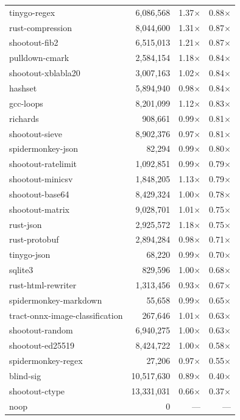\begin{longtable}{l r r r}
tinygo-regex & 6{,}086{,}568 & 1.37$\times$ & 0.88$\times$ \\
rust-compression & 8{,}044{,}600 & 1.31$\times$ & 0.87$\times$ \\
shootout-fib2 & 6{,}515{,}013 & 1.21$\times$ & 0.87$\times$ \\
pulldown-cmark & 2{,}584{,}154 & 1.18$\times$ & 0.84$\times$ \\
shootout-xblabla20 & 3{,}007{,}163 & 1.02$\times$ & 0.84$\times$ \\
hashset & 5{,}894{,}940 & 0.98$\times$ & 0.84$\times$ \\
gcc-loops & 8{,}201{,}099 & 1.12$\times$ & 0.83$\times$ \\
richards & 908{,}661 & 0.99$\times$ & 0.81$\times$ \\
shootout-sieve & 8{,}902{,}376 & 0.97$\times$ & 0.81$\times$ \\
spidermonkey-json & 82{,}294 & 0.99$\times$ & 0.80$\times$ \\
shootout-ratelimit & 1{,}092{,}851 & 0.99$\times$ & 0.79$\times$ \\
shootout-minicsv & 1{,}848{,}205 & 1.13$\times$ & 0.79$\times$ \\
shootout-base64 & 8{,}429{,}324 & 1.00$\times$ & 0.78$\times$ \\
shootout-matrix & 9{,}028{,}701 & 1.01$\times$ & 0.75$\times$ \\
rust-json & 2{,}925{,}572 & 1.18$\times$ & 0.75$\times$ \\
rust-protobuf & 2{,}894{,}284 & 0.98$\times$ & 0.71$\times$ \\
tinygo-json & 68{,}220 & 0.99$\times$ & 0.70$\times$ \\
sqlite3 & 829{,}596 & 1.00$\times$ & 0.68$\times$ \\
rust-html-rewriter & 1{,}313{,}456 & 0.93$\times$ & 0.67$\times$ \\
spidermonkey-markdown & 55{,}658 & 0.99$\times$ & 0.65$\times$ \\
tract-onnx-image-classification & 267{,}646 & 1.01$\times$ & 0.63$\times$ \\
shootout-random & 6{,}940{,}275 & 1.00$\times$ & 0.63$\times$ \\
shootout-ed25519 & 8{,}424{,}722 & 1.00$\times$ & 0.58$\times$ \\
spidermonkey-regex & 27{,}206 & 0.97$\times$ & 0.55$\times$ \\
blind-sig & 10{,}517{,}630 & 0.89$\times$ & 0.40$\times$ \\
shootout-ctype & 13{,}331{,}031 & 0.66$\times$ & 0.37$\times$ \\
noop & 0 & --- & --- \\
\end{longtable}

